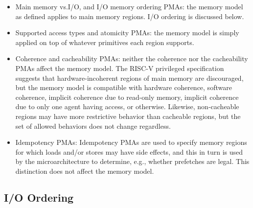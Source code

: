 \begin{itemize}
  \item Main memory vs.\@ I/O, and I/O memory ordering PMAs: the memory model as defined applies to main memory regions.  I/O ordering is discussed below.
  \item Supported access types and atomicity PMAs: the memory model is simply applied on top of whatever primitives each region supports.
  \item Coherence and cacheability PMAs: neither the coherence nor the cacheability PMAs affect the memory model.  The RISC-V privileged specification suggests that hardware-incoherent regions of main memory are discouraged, but the memory model is compatible with hardware coherence, software coherence, implicit coherence due to read-only memory, implicit coherence due to only one agent having access, or otherwise.  Likewise, non-cacheable regions may have more restrictive behavior than cacheable regions, but the set of allowed behaviors does not change regardless.
  \item Idempotency PMAs: Idempotency PMAs are used to specify memory regions for which loads and/or stores may have side effects, and this in turn is used by the microarchitecture to determine, e.g., whether prefetches are legal.  This distinction does not affect the memory model.
\end{itemize}


\subsection{I/O Ordering}

